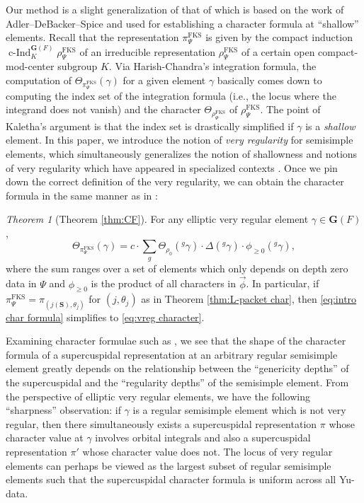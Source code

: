 \documentclass{amsart}
\newcommand{\FKS}{\mathrm{FKS}}
\newcommand{\bfG}{\mathbf{G}}
\newcommand{\bfS}{\mathbf{S}}
\DeclareMathOperator{\cInd}{c-Ind}
\theoremstyle{plain}
\theoremstyle{definition}
\theoremstyle{remark}
\theoremstyle{theorem}
\newtheorem{displaytheorem}{Theorem}
\begin{document}
Our method is a slight generalization of that of \cite{Kal19} which is based on the work of Adler--DeBacker--Spice \cite{AS09,DS18} and used for establishing a character formula at ``shallow'' elements.
Recall that the representation $\pi^{\FKS}_{\Psi}$ is given by the compact induction $\cInd_{K}^{\bfG(F)}\rho^{\FKS}_{\Psi}$ of an irreducible representation $\rho^{\FKS}_{\Psi}$ of a certain open compact-mod-center subgroup $K$.
Via Harish-Chandra's integration formula, the computation of $\Theta_{\pi^{\FKS}_{\Psi}}(\gamma)$ for a given element $\gamma$ basically comes down to computing the index set of the integration formula (i.e., the locus where the integrand does not vanish) and the character $\Theta_{\rho^{\FKS}_{\Psi}}$ of $\rho^{\FKS}_{\Psi}$.
The point of Kaletha's argument is that the index set is drastically simplified if $\gamma$ is a \textit{shallow} element.
In this paper, we introduce the notion of \textit{very regularity} for semisimple elements, which simultaneously generalizes the notion of shallowness and notions of very regularity which have appeared in specialized contexts \cite{Hen92,Hen93,CI21-RT,CO21}.
Once we pin down the correct definition of the very regularity, we can obtain the character formula in the same manner as in \cite{Kal19}:

\begin{displaytheorem}[Theorem \ref{thm:CF}]\label{thm:intro character formula}
    For any elliptic very regular element $\gamma \in \bfG(F)$,
    \begin{equation}\label{eq:intro char formula}
        \Theta_{\pi_{\Psi}^{\FKS}}(\gamma) = c \cdot \sum_{g} \Theta_{\rho_0}({}^g \gamma) \cdot \Delta({}^g \gamma) \cdot \phi_{\geq 0}({}^g \gamma),
    \end{equation}
    where the sum ranges over a set of elements which only depends on depth zero data in $\Psi$ and $\phi_{\geq0}$ is the product of all characters in $\vec{\phi}$.
    In particular, if $\pi_\Psi^{\FKS} = \pi_{(j(\bfS),\theta_j)}$ for $(j,\theta_j)$ as in Theorem \ref{thm:L-packet char}, then \eqref{eq:intro char formula} simplifies to \eqref{eq:vreg character}.
\end{displaytheorem}

Examining character formulae such as \cite[Theorem 7.1]{AS09}, we see that the shape of the character formula of a supercuspidal representation at an arbitrary regular semisimple element greatly depends on the relationship between the ``genericity depths'' of the supercuspidal and the ``regularity depths'' of the semisimple element. From the perspective of elliptic very regular elements, we have the following ``sharpness'' observation: if $\gamma$ is a regular semisimple element which is not very regular, then there simultaneously exists a supercuspidal representation $\pi$ whose character value at $\gamma$ involves orbital integrals and also a supercuspidal representation $\pi'$ whose character value does not. The locus of very regular elements can perhaps be viewed as the largest subset of regular semisimple elements such that the supercuspidal character formula is uniform across all Yu-data. 
\end{document}
